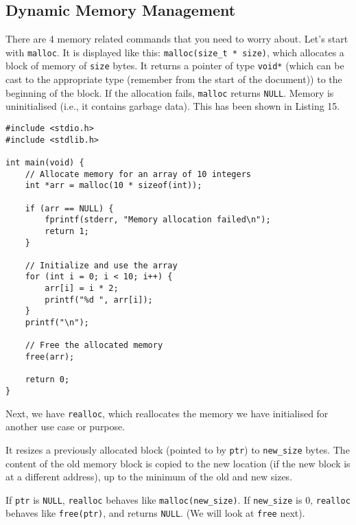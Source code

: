 \documentclass[a4paper,12pt]{article}
\begin{document}
\newpage

\subsection{Dynamic Memory Management}

There are 4 memory related commands that you need to worry about. Let's start with \verb|malloc|. It is displayed like this: \verb|malloc(size_t * size)|, which allocates a block of memory of \verb|size| bytes. It returns a pointer of type \verb|void*| (which can be cast to the appropriate type (remember from the start of the document)) to the beginning of the block. If the allocation fails, \verb|malloc| returns \verb|NULL|. Memory is uninitialised (i.e., it contains garbage data). This has been shown in Listing 15.

\begin{lstlisting}[caption=Dynamic memory management using the Heap]
#include <stdio.h>
#include <stdlib.h>

int main(void) {
    // Allocate memory for an array of 10 integers
    int *arr = malloc(10 * sizeof(int));

    if (arr == NULL) {
        fprintf(stderr, "Memory allocation failed\n");
        return 1;
    }

    // Initialize and use the array
    for (int i = 0; i < 10; i++) {
        arr[i] = i * 2;
        printf("%d ", arr[i]);
    }
    printf("\n");

    // Free the allocated memory
    free(arr);

    return 0;
}
\end{lstlisting}
Next, we have \verb|realloc|, which reallocates the memory we have initialised for another use case or purpose.

It resizes a previously allocated block (pointed to by \verb|ptr|) to \verb|new_size| bytes. The content of the old memory block is copied to the new location (if the new block is at a different address), up to the minimum of the old and new sizes.

If \verb|ptr| is \verb|NULL|, \verb|realloc| behaves like \verb|malloc(new_size)|.
If \verb|new_size| is 0, \verb|realloc| behaves like \verb|free(ptr)|, and returns \verb|NULL|. (We will look at \verb|free| next).\\
\end{document}
